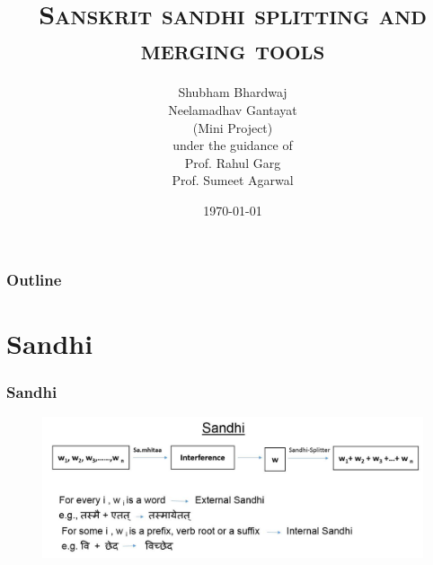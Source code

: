 \documentclass[xcolor=dvipsnames]{beamer}
\begin{document}


	\title[Sanskrit Sandhi]{\textsc{Sanskrit sandhi splitting and merging tools}}
	\author[Shubham, Neelamadhav]{Shubham Bhardwaj \\ Neelamadhav Gantayat\\ \small{(Mini Project)} \\   \small{under the guidance of} \\ 
	\large{Prof. Rahul Garg \\ Prof. Sumeet Agarwal}}
	
	
	\date[\today]{\today}
	
 \begin{frame}
   
 	\titlepage
 
 \end{frame}
 
 
 \begin{frame}
 \frametitle{Outline}
      {\tableofcontents}
 \end{frame}
 

\section{Sandhi}
\begin{frame}
\frametitle{Sandhi}
\begin{figure}
	\includegraphics[scale=0.35]{img/sandhi.png} 
 \end{figure}
\end{frame}
\end{document}
